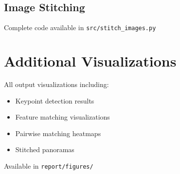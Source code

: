 \documentclass[12pt,a4paper]{article}
\begin{document}
\subsection{Image Stitching}
Complete code available in \texttt{src/stitch\_images.py}

\section{Additional Visualizations}

All output visualizations including:
\begin{itemize}
    \item Keypoint detection results
    \item Feature matching visualizations
    \item Pairwise matching heatmaps
    \item Stitched panoramas
\end{itemize}

Available in \texttt{report/figures/}
\end{document}
